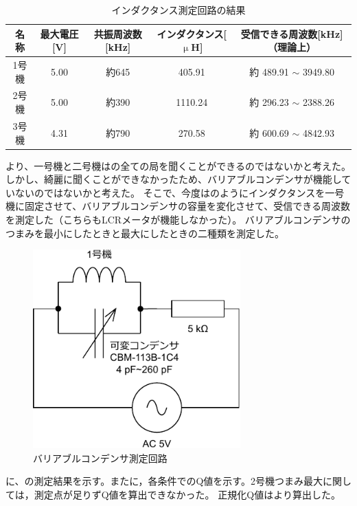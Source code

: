 \documentclass[report.tex]{subfiles}
\begin{document}
\begin{table}[H]
	\centering
	\caption{インダクタンス測定回路の結果}
	\label{tab:ant2}
	\begin{tabular}{ccccc} \hline
		名称  & 最大電圧[V] & 共振周波数[kHz] & インダクタンス[\(\upmu\)H] & 受信できる周波数[kHz]（理論上）        \\ \hline
		1号機 & 5.00    & 約645       & 405.91              & 約 489.91 \(\sim\) 3949.80 \\
		2号機 & 5.00    & 約390       & 1110.24             & 約 296.23 \(\sim\) 2388.26 \\
		3号機 & 4.31    & 約790       & 270.58              & 約 600.69 \(\sim\) 4842.93 \\ \hline
	\end{tabular}
\end{table}

より、一号機と二号機はの全ての局を聞くことができるのではないかと考えた。
しかし、綺麗に聞くことができなかったため、バリアブルコンデンサが機能していないのではないかと考えた。
そこで、今度はのようにインダクタンスを一号機に固定させて、バリアブルコンデンサの容量を変化させて、受信できる周波数を測定した（こちらもLCRメータが機能しなかった）。
バリアブルコンデンサのつまみを最小にしたときと最大にしたときの二種類を測定した。

\begin{figure}[H]
	\centering
	\includegraphics[width=8cm]{fig/inda3.pdf}
	\caption{バリアブルコンデンサ測定回路}
	\label{fig:inda3}
\end{figure}

に、の測定結果を示す。またに，各条件でのQ値を示す。2号機つまみ最大に関しては，測定点が足りずQ値を算出できなかった。
正規化Q値はより算出した。
\end{document}
